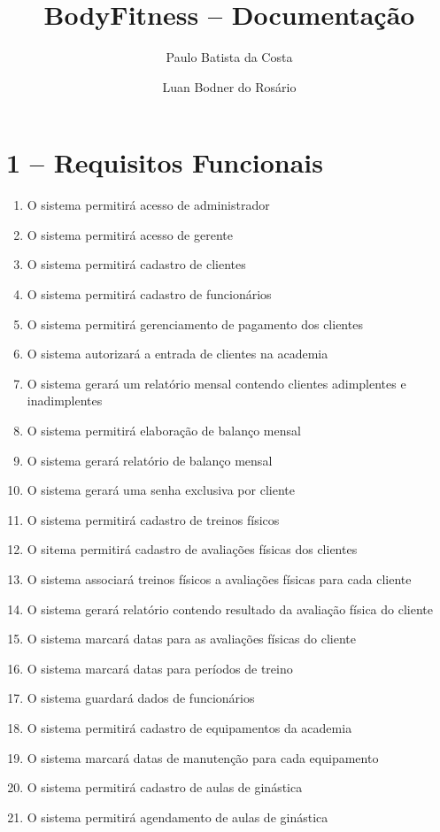\documentclass[12pt,a4paper,oneside]{report}
\author{Paulo Batista da Costa \and Luan Bodner do Rosário}
\title{BodyFitness -- Documentação}
\begin{document}
	\maketitle
	\section*{1 -- Requisitos Funcionais}

	\begin{enumerate}
		
		 \item O sistema permitirá acesso de administrador
		 \item O sistema permitirá acesso de gerente
		 \item O sistema permitirá cadastro de clientes
		 \item O sistema permitirá cadastro de funcionários
		 \item O sistema permitirá gerenciamento de pagamento dos clientes
		 \item O sistema autorizará a entrada de clientes na academia
		 \item O sistema gerará um relatório mensal contendo clientes adimplentes e inadimplentes 
		 \item O sistema permitirá elaboração de balanço mensal
		 \item O sistema gerará relatório de balanço mensal
		 \item O sistema gerará uma senha exclusiva por cliente
		 \item O sistema permitirá cadastro de treinos físicos
		 \item O sitema permitirá cadastro de avaliações físicas dos clientes
		 \item O sistema associará treinos físicos a avaliações físicas para cada cliente
		 \item O sistema gerará relatório contendo resultado da avaliação física do cliente
		 \item O sistema marcará datas para as avaliações físicas do cliente
		 \item O sistema marcará datas para períodos de treino
		 \item O sistema guardará dados de funcionários
		 \item O sistema permitirá cadastro de equipamentos da academia
		 \item O sistema marcará datas de manutenção para cada equipamento
		 \item O sistema permitirá cadastro de aulas de ginástica
		 \item O sistema permitirá agendamento de aulas de ginástica
	

	\end{enumerate}
\end{document}
